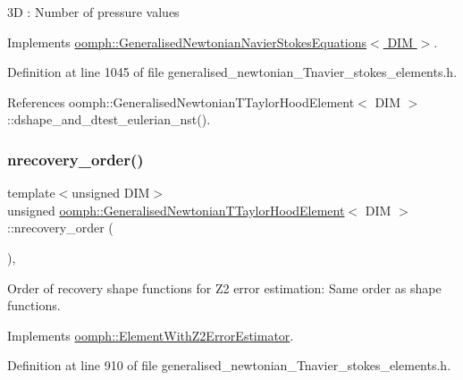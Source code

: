 3D \+: Number of pressure values 

Implements \hyperlink{classoomph_1_1GeneralisedNewtonianNavierStokesEquations_ad25a5d1b7a7e7cf128b9154f08739824}{oomph\+::\+Generalised\+Newtonian\+Navier\+Stokes\+Equations$<$ D\+I\+M $>$}.



Definition at line 1045 of file generalised\+\_\+newtonian\+\_\+\+Tnavier\+\_\+stokes\+\_\+elements.\+h.



References oomph\+::\+Generalised\+Newtonian\+T\+Taylor\+Hood\+Element$<$ D\+I\+M $>$\+::dshape\+\_\+and\+\_\+dtest\+\_\+eulerian\+\_\+nst().

\mbox{\label{classoomph_1_1GeneralisedNewtonianTTaylorHoodElement_af02e0f6528abd5e17aceceb96811fe25}} 
\subsubsection{\texorpdfstring{nrecovery\+\_\+order()}{nrecovery\_order()}}
{\footnotesize\ttfamily template$<$unsigned D\+IM$>$ \\
unsigned \hyperlink{classoomph_1_1GeneralisedNewtonianTTaylorHoodElement}{oomph\+::\+Generalised\+Newtonian\+T\+Taylor\+Hood\+Element}$<$ D\+IM $>$\+::nrecovery\+\_\+order (\begin{DoxyParamCaption}{ }\end{DoxyParamCaption})\hspace{0.3cm}{\ttfamily [inline]}, {\ttfamily [virtual]}}



Order of recovery shape functions for Z2 error estimation\+: Same order as shape functions. 



Implements \hyperlink{classoomph_1_1ElementWithZ2ErrorEstimator_af39480835bd3e0f6b2f4f7a9a4044798}{oomph\+::\+Element\+With\+Z2\+Error\+Estimator}.



Definition at line 910 of file generalised\+\_\+newtonian\+\_\+\+Tnavier\+\_\+stokes\+\_\+elements.\+h.

